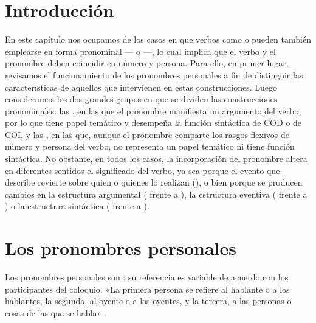 
\section{Introducción}

En este capítulo nos ocupamos de los casos en que verbos como  o  pueden también emplearse en forma
pronominal --- o ---, lo
cual implica que el verbo y el pronombre deben coincidir en número y persona.
Para ello, en primer lugar, revisamos el funcionamiento de los pronombres
personales a fin de distinguir las características de aquellos que intervienen
en estas construcciones. Luego consideramos los dos grandes grupos en que se
dividen las construcciones pronominales: las , en las que el
pronombre manifiesta un argumento del verbo, por lo que tiene papel temático y
desempeña la función sintáctica de COD o de COI, y las
, en las que, aunque el pronombre comparte los rasgos
flexivos de número y persona del verbo, no representa un papel temático ni tiene
función sintáctica. No obstante, en todos los casos, la incorporación del
pronombre altera en diferentes sentidos el significado del verbo, ya sea porque
el evento que describe revierte sobre quien o quienes lo realizan (), o bien porque se producen cambios en la estructura
argumental ( frente a ), la estructura eventiva ( frente a ) o la estructura sintáctica ( frente a
).

\section{Los pronombres personales}\label{sec:10-pronombres}

Los pronombres personales son : su referencia es variable de
acuerdo con los participantes del coloquio. «La primera persona se refiere al
hablante o a los hablantes, la segunda, al oyente o a los oyentes, y la tercera,
a las personas o cosas de las que se habla» \parencite[§\,4.4a]{rae2025}.

